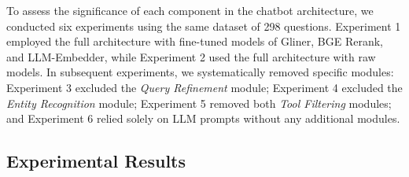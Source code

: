 \documentclass[runningheads]{llncs}
\begin{document}

To assess the significance of each component in the chatbot architecture, we conducted six experiments using the same dataset of 298 questions. Experiment 1 employed the full architecture with fine-tuned models of Gliner, BGE Rerank, and LLM-Embedder, while Experiment 2 used the full architecture with raw models. In subsequent experiments, we systematically removed specific modules: Experiment 3 excluded the \textit{Query Refinement} module; Experiment 4 excluded the \textit{Entity Recognition} module; Experiment 5 removed both \textit{Tool Filtering} modules; and Experiment 6 relied solely on LLM prompts without any additional modules.
\subsection{Experimental Results}
\end{document}
